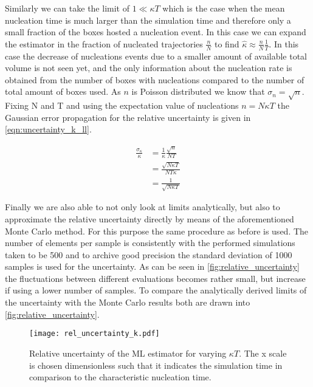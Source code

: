 Similarly we can take the limit of $1 \ll \kappa T$ which is the case when the mean nucleation time is much larger than the simulation time and therefore only a small fraction of the boxes hosted a nucleation event. In this case we can expand the estimator in the fraction of nucleated trajectories $\frac{n}{N}$ to find $\hat{\kappa} \approx \frac{n}{N} \frac{1}{T}$. In this case the decrease of nucleations events due to a smaller amount of available total volume is not seen yet, and the only information about the nucleation rate is obtained from the number of boxes with nucleations compared to the number of total amount of boxes used. As $n$ is Poisson distributed we know that $\sigma_n = \sqrt{n}$. Fixing N and T and using the expectation value of nucleations $n = N \kappa T$ the Gaussian error propagation for the relative uncertainty is given in \autoref{eqn:uncertainty_k_ll}.

\begin{align}
\label{eqn:uncertainty_k_ll}
\frac{\sigma_{\kappa}}{\kappa} &= \frac{1}{\kappa} \frac{\sqrt{n}}{NT} \nonumber\\
&=\frac{\sqrt{N \kappa T}}{N T \kappa} \nonumber\\
&=\frac{1}{\sqrt{N \kappa T}}
\end{align}

Finally we are also able to not only look at limits analytically, but also to approximate the relative uncertainty directly by means of the aforementioned Monte Carlo method. For this purpose the same procedure as before is used. The number of elements per sample is consistently with the performed simulations taken to be 500 and to archive good precision the standard deviation of 1000 samples is used for the uncertainty. As can be seen in \autoref{fig:relative_uncertainty} the fluctuations between different evaluations becomes rather small, but increase if using a lower number of samples. To compare the analytically derived limits of the uncertainty with the Monte Carlo results both are drawn into \autoref{fig:relative_uncertainty}.

\begin{figure}[ht]
\begin{center}
\texttt{[image: rel\_uncertainty\_k.pdf]}
\caption[Nucleation rate uncertainty depending on measurement time]{Relative uncertainty of the ML estimator for varying $\kappa T$. The x scale is chosen dimensionless such that it indicates the simulation time in comparison to the characteristic nucleation time.}
\label{fig:relative_uncertainty}
\end{center}
\end{figure}

